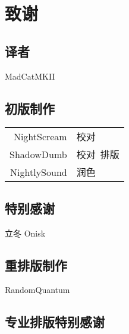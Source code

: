 
\chapter{致谢}

\pagestyle{chinese}

\section*{译者}

\begin{center}
    MadCatMKII
\end{center}

\section*{初版制作}

\begin{table}[H]
    \centering
    \begin{tabular}{rl}
        NightScream & 校对 \\
        ShadowDumb & 校对\ 排版 \\
        NightlySound & 润色 \\
    \end{tabular}
\end{table}

\section*{特别感谢}

\begin{center}
    立冬 \quad Onisk
\end{center}

\section*{重排版制作}

\begin{center}
    RandomQuantum
\end{center}

\section*{专业排版特别感谢}

